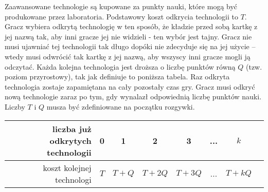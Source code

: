 \documentclass[11pt,a4paper]{article}
\begin{document}
Zaawansowane technologie są kupowane za punkty nauki, które mogą być produkowane przez laboratoria. Podstawowy koszt odkrycia technologii to $T$. Gracz wybiera odkrytą technologię w ten sposób, że kładzie przed sobą kartkę z jej nazwą tak, aby inni gracze jej nie widzieli - ten wybór jest tajny. Gracz nie musi ujawniać tej technologii tak długo dopóki nie zdecyduje się na jej użycie -- wtedy musi odwrócić tak kartkę z jej nazwą, aby wszyscy inni gracze mogli ją odczytać. Każda kolejna technologia jest droższa o liczbę punktów równą $Q$ (tzw. poziom przyrostowy), tak jak definiuje to poniższa tabela. Raz odkryta technologia zostaje zapamiętana na cały pozostały czas gry. Gracz musi odkryć nową technologie zaraz po tym, gdy wynalazł odpowiednią liczbę punktów nauki. Liczby $T$ i $Q$ musza być zdefiniowane na początku rozgywki.
\begin{center}
  \begin{tabular}{| r | c | c | c | c | c | c | c |}
    \hline
    liczba już odkrytych technologii & 0 & 1 & 2 & 3  & ... & $k$ \\
    \hline
    koszt kolejnej technologi & $T$ & $T+Q$ & $T+2Q$ & $T+3Q$ & ... & $T+kQ$ \\
    \hline
  \end{tabular}
\end{center}
\end{document}
